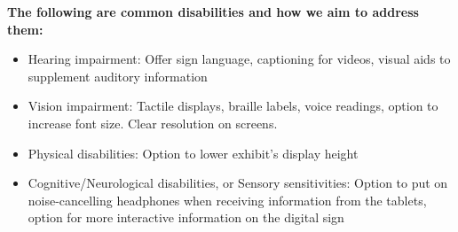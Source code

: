 \documentclass{exam}
\begin{document}
\pagebreak
\textbf{\large{The following are common disabilities and how we aim to address them:}}\\
\begin{itemize}
\item Hearing impairment: Offer sign language, captioning for videos, visual aids to supplement auditory information
\item Vision impairment: Tactile displays, braille labels, voice readings, option to increase font size. Clear resolution on screens.
\item Physical disabilities: Option to lower exhibit's display height
\item Cognitive/Neurological disabilities, or Sensory sensitivities: Option to put on noise-cancelling headphones when receiving information from the tablets, option for more interactive information on the digital sign
\end{itemize}
\end{document}
